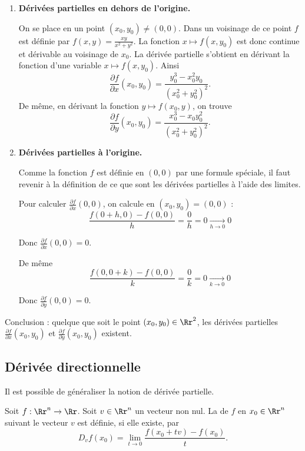\documentclass[12pt, class=report,crop=false]{standalone}
\begin{document}
{\begin{exemple}
\begin{enumerate}
   
   
   
  \item \textbf{Dérivées partielles en dehors de l'origine.}
  
  On se place en un point $(x_0,y_0) \neq (0,0)$. Dans un voisinage de ce point $f$ est définie par $f(x,y) = \frac{xy}{x^2 + y^2}$. 
  	La fonction $x \mapsto f(x,y_0)$ est donc continue et dérivable au voisinage de $x_0$. La dérivée partielle s'obtient en dérivant la fonction d'une variable  $x \mapsto f(x,y_0)$. Ainsi
$$\frac{\partial f}{\partial x}(x_0,y_0) = \frac{y_0^3-x_0^2y_0}{(x_0^2+y_0^2)^2}.$$  	
De même, en dérivant la fonction $y \mapsto f(x_0,y)$, on trouve 
$$\frac{\partial f}{\partial y}(x_0,y_0) = \frac{x_0^3-x_0y_0^2}{(x_0^2+y_0^2)^2}.$$  

  \item \textbf{Dérivées partielles à l'origine.}
  
  Comme la fonction $f$ est définie en $(0,0)$ par une formule spéciale, il faut revenir à la définition de ce que sont les dérivées partielles à l'aide des limites.
  
  Pour calculer $\frac{\partial f}{\partial x}(0,0)$, on calcule en $(x_0,y_0)=(0,0)$ :
  $$\frac{f(0+h,0) - f(0,0)}{h} = \frac{0}{h} = 0 \underset{h\to 0}{\longrightarrow} 0$$
  
  Donc $\frac{\partial f}{\partial x}(0,0) = 0$.
  
  De même 
   $$\frac{f(0,0+k) - f(0,0)}{k} = \frac{0}{k} = 0 \underset{k\to 0}{\longrightarrow} 0$$
  
  Donc $\frac{\partial f}{\partial y}(0,0) = 0$.  
  
  
\end{enumerate}
  
Conclusion : quelque que soit le point $(x_0,y_0)\in\Rr^2$, les dérivées partielles $\frac{\partial f}{\partial x}(x_0,y_0)$ et $\frac{\partial f}{\partial y}(x_0,y_0)$ existent.
\end{exemple}



\subsection{Dérivée directionnelle}

Il est possible de généraliser la notion de dérivée partielle.
\begin{definition}
Soit $f : \Rr^n \to \Rr$.
Soit $v \in \Rr^n$ un vecteur non nul. La  de $f$ 
en $x_0 \in \Rr^n$ suivant le vecteur $v$ est définie, si elle existe, par
$$D_{v}f(x_0)= \lim_{t\to 0} \frac{f(x_0 + t v)-f(x_0)}{t}.$$
\end{definition}


}
\end{document}
